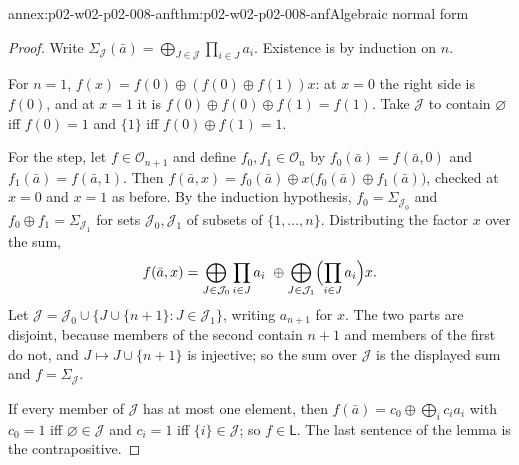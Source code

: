 \begin{annexitem}{annex:p02-w02-p02-008-anf}{thm:p02-w02-p02-008-anf}{Algebraic normal form}
\begin{proof}
Write \(\Sigma_{\mathcal J}(\bar a)=\bigoplus_{J\in\mathcal J}\prod_{i\in
J}a_i\).  Existence is by induction on \(n\).

For \(n=1\), \(f(x)=f(0)\oplus(f(0)\oplus f(1))x\): at \(x=0\) the right side
is \(f(0)\), and at \(x=1\) it is \(f(0)\oplus f(0)\oplus f(1)=f(1)\).  Take
\(\mathcal J\) to contain \(\varnothing\) iff \(f(0)=1\) and \(\{1\}\) iff
\(f(0)\oplus f(1)=1\).

For the step, let \(f\in\mathcal O_{n+1}\) and define
\(f_0,f_1\in\mathcal O_n\) by \(f_0(\bar a)=f(\bar a,0)\) and
\(f_1(\bar a)=f(\bar a,1)\).  Then
\(f(\bar a,x)=f_0(\bar a)\oplus x\bigl(f_0(\bar a)\oplus f_1(\bar a)\bigr)\),
checked at \(x=0\) and \(x=1\) as before.  By the induction hypothesis,
\(f_0=\Sigma_{\mathcal J_0}\) and \(f_0\oplus f_1=\Sigma_{\mathcal J_1}\) for
sets \(\mathcal J_0,\mathcal J_1\) of subsets of \(\{1,\ldots,n\}\).
Distributing the factor \(x\) over the sum,
\[
 f(\bar a,x)=\bigoplus_{J\in\mathcal J_0}\prod_{i\in J}a_i\ \oplus
 \bigoplus_{J\in\mathcal J_1}\Bigl(\prod_{i\in J}a_i\Bigr)x .
\]
Let \(\mathcal J=\mathcal J_0\cup\{J\cup\{n+1\}:J\in\mathcal J_1\}\), writing
\(a_{n+1}\) for \(x\).  The two parts are disjoint, because members of the
second contain \(n+1\) and members of the first do not, and
\(J\mapsto J\cup\{n+1\}\) is injective; so the sum over \(\mathcal J\) is the
displayed sum and \(f=\Sigma_{\mathcal J}\).

If every member of \(\mathcal J\) has at most one element, then
\(f(\bar a)=c_0\oplus\bigoplus_ic_ia_i\) with \(c_0=1\) iff
\(\varnothing\in\mathcal J\) and \(c_i=1\) iff \(\{i\}\in\mathcal J\); so
\(f\in\mathsf L\).  The last sentence of the lemma is the contrapositive.
\end{proof}
\end{annexitem}

